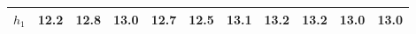 
        \begin{tabular}{c|*{10}{c}}
            \hline
            \hline
                \(h_{1}\) & 12.2 & 12.8 & 13.0 & 12.7 & 12.5 & 13.1 & 13.2 & 13.2 & 13.0 & 13.0 \\
            \hline
            
            \hline
            \hline
        \end{tabular}
        